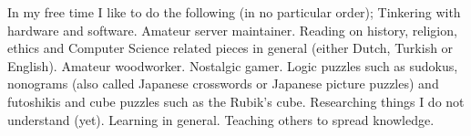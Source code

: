 
\begin{cvparagraph}
	In my free time I like to do the following (in no particular order); Tinkering with hardware and software. Amateur server maintainer. Reading on history, religion, ethics and Computer Science related pieces in general (either Dutch, Turkish or English). Amateur woodworker. Nostalgic gamer. Logic puzzles such as sudokus, nonograms (also called Japanese crosswords or Japanese picture puzzles) and futoshikis and cube puzzles such as the Rubik's cube. Researching things I do not understand (yet). Learning in general. Teaching others to spread knowledge.
\end{cvparagraph}
